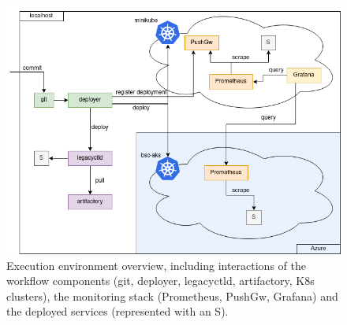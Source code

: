 \documentclass[../main.tex]{subfiles}
\begin{document}
    \begin{figure}[h]
        \centering
        \includegraphics[width=\linewidth]{img/impl_instr_v2.png}
        \captionsetup{justification=centering}
        \caption{
            Execution environment overview, including interactions of the workflow components (git, deployer, legacyctld, artifactory, K8s clusters), the monitoring stack (Prometheus, PushGw, Grafana) and the deployed services (represented with an S).
        }
        \label{fig:impl_instr}
    \end{figure}
\end{document}
